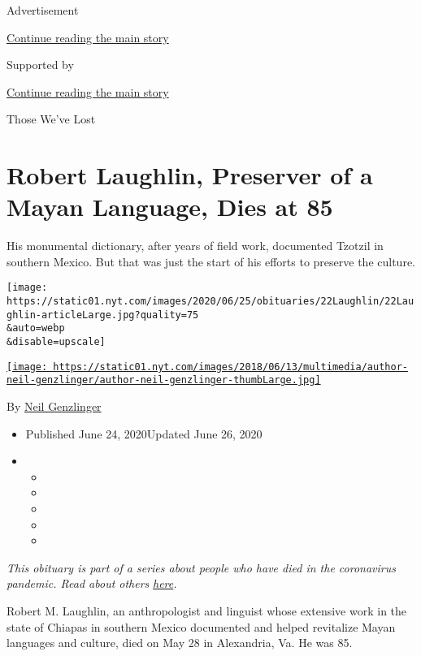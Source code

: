 Advertisement

\protect\hyperlink{after-top}{Continue reading the main story}

Supported by

\protect\hyperlink{after-sponsor}{Continue reading the main story}

Those We've Lost

\hypertarget{robert-laughlin-preserver-of-a-mayan-language-dies-at-85}{%
\section{Robert Laughlin, Preserver of a Mayan Language, Dies at
85}\label{robert-laughlin-preserver-of-a-mayan-language-dies-at-85}}

His monumental dictionary, after years of field work, documented Tzotzil
in southern Mexico. But that was just the start of his efforts to
preserve the culture.

\texttt{[image: https://static01.nyt.com/images/2020/06/25/obituaries/22Laughlin/22Laughlin-articleLarge.jpg?quality=75\\\&auto=webp\\\&disable=upscale]}

\href{https://www.nytimes.com/by/neil-genzlinger}{\texttt{[image: https://static01.nyt.com/images/2018/06/13/multimedia/author-neil-genzlinger/author-neil-genzlinger-thumbLarge.jpg]}}

By \href{https://www.nytimes.com/by/neil-genzlinger}{Neil Genzlinger}

\begin{itemize}
\item
  Published June 24, 2020Updated June 26, 2020
\item
  \begin{itemize}
  \item
  \item
  \item
  \item
  \item
  \end{itemize}
\end{itemize}

\emph{This obituary is part of a series about people who have died in
the coronavirus pandemic. Read about others}
\href{https://www.nytimes.com/interactive/2020/obituaries/people-died-coronavirus-obituaries.html}{\emph{here}}\emph{.}

Robert M. Laughlin, an anthropologist and linguist whose extensive work
in the state of Chiapas in southern Mexico documented and helped
revitalize Mayan languages and culture, died on May 28 in Alexandria,
Va. He was 85.

